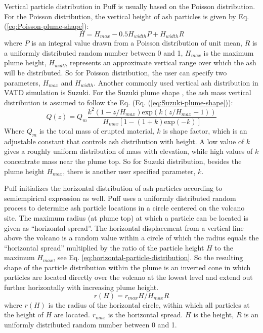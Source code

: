 \documentclass[utf8]{frontiersSCNS} %
\begin{document}
Vertical particle distribution in Puff is usually based on the Poisson distribution. For the Poisson distribution, the vertical height of ash particles is given by Eq. (\ref{eq:Poisson-plume-shape}):
\begin{equation}
H=H_{max} - 0.5 H_{width}P+H_{width}R
\label{eq:Poisson-plume-shape}
\end{equation}
where $P$ is an integral value drawn from a Poisson distribution of unit mean, $R$ is a uniformly distributed random number between 0 and 1, $H_{max}$ is the maximum plume height, $H_{width}$ represents an approximate vertical range over which the ash will be distributed. So for Poisson distribution, the user can specify two parameters, $H_{max}$ and $H_{width}$.
Another commonly used vertical ash distribution in VATD simulation is Suzuki. For the Suzuki plume shape \citep{suzuki1983theoretical}, the ash mass vertical distribution is assumed to follow the Eq. (Eq. (\ref{eq:Suzuki-plume-shape})):
\begin{equation}
Q(z)=Q_m \frac{k^2(1-z/H_{max})\mbox{exp}\left(k(z/H_{max} -1 )\right)}{H_{max}\left[1-(1+k) \mbox{exp}(-k)\right]}
\label{eq:Suzuki-plume-shape}
\end{equation}
Where $Q_m$ is the total mass of erupted material, $k$ is shape factor, which is an adjustable constant that controls ash distribution with height. A low value of $k$ gives a roughly uniform distribution of mass with elevation, while high values of $k$ concentrate mass near the plume top.
So for Suzuki distribution, besides the plume height $H_{max}$, there is another user specified parameter, $k$.

Puff initializes the horizontal distribution of ash particles according to semiempirical expression as well. Puff uses a uniformly distributed random process to determine ash particle locations in a circle centered on the volcano site. The maximum radius (at plume top) at which a particle can be located is given as ``horizontal spread''. The horizontal displacement from a vertical line above the volcano is a random value within a circle of which the radius equals the ``horizontal spread'' multiplied by the ratio of the particle height $H$ to the maximum $H_{max}$, see Eq. \ref{eq:horizontal-particle-distribution}. So the resulting shape of the particle distribution within the plume is an inverted cone in which particles are located directly over the volcano at the lowest level and extend out further horizontally with increasing plume height.
\begin{equation}
r(H)= r_{max}  H / H_{max}  R
\label{eq:horizontal-particle-distribution} 
\end{equation}
where $r(H)$ is the radius of the horizontal circle, within which all particles at the height of $H$ are located. $r_{max}$ is the horizontal spread. $H$ is the height, $R$ is an uniformly distributed random number between 0 and 1.
\end{document}
